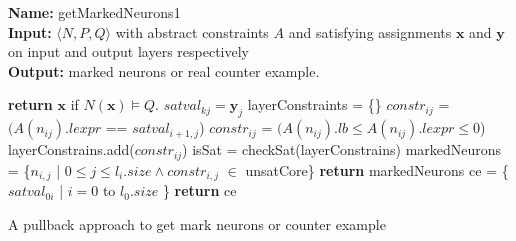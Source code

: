 \begin{algorithm}[t]
  \textbf{Name: } getMarkedNeurons1 \\
  \textbf{Input: } $\langle N,P,Q \rangle$ with abstract constraints $A$ and satisfying assignments $\boldsymbol{x}$ and $\boldsymbol{y}$ on input and output layers respectively\\
  \textbf{Output: } marked neurons or real counter example. 
  \begin{algorithmic}[1]
    \State \textbf{return} $\boldsymbol{x}$ if $N(\boldsymbol{x}) \models Q$. 
    \State $satval_{kj} = \boldsymbol{y}_j$
   \EndFor
        \State layerConstraints = \{\}
            \State $constr_{ij}$ = $(A(n_{ij}).lexpr$ == $satval_{i+1,j}$) 
          \Else
            \State $constr_{ij}$ = $(A(n_{ij}).lb \leq A(n_{ij}).lexpr \leq 0$)
          \EndIf
          \State layerConstrains.add($constr_{ij}$)
        \EndFor
        \State isSat = checkSat(layerConstrains) 
          \State markedNeurons = \{$n_{i,j}$ | $0 \leq j\leq l_i.size \land constr_{i,j}$ $\in$ unsatCore\}
          \State \textbf{return } markedNeurons
        \EndIf
      \EndIf
   \EndFor
    \State ce = \{$satval_{0i}$ | $i=0$ to $l_{0}.size$ \} 
    \State \textbf{return} ce
  \end{algorithmic}
  \caption{A pullback approach to get mark neurons or counter example}
  \label{algo:refine1}
\end{algorithm}


